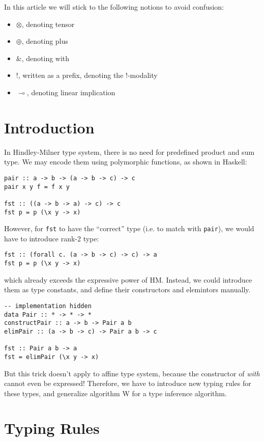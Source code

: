 \documentclass{article}
\begin{document}
\bigskip

In this article we will stick to the following notions to avoid confusion:
\begin{itemize}
  \item $\otimes$, denoting tensor
  \item $\oplus$, denoting plus
  \item $\&$, denoting with
  \item $!$, written as a prefix, denoting the !-modality
  \item $\multimap$, denoting linear implication
\end{itemize}

\section{Introduction}

In Hindley-Milner type system, there is no need for predefined product and sum type. We may encode them using polymorphic functions, as shown in Haskell:
\begin{lstlisting}
pair :: a -> b -> (a -> b -> c) -> c
pair x y f = f x y

fst :: ((a -> b -> a) -> c) -> c
fst p = p (\x y -> x)
\end{lstlisting}
However, for \lstinline{fst} to have the ``correct'' type (i.e. to match with \lstinline{pair}), we would have to introduce rank-2 type:
\begin{lstlisting}
fst :: (forall c. (a -> b -> c) -> c) -> a
fst p = p (\x y -> x)
\end{lstlisting}
which already exceeds the expressive power of HM. Instead, we could introduce them as type constants, and define their constructors and elemintors manually.
\begin{lstlisting}
-- implementation hidden
data Pair :: * -> * -> *
constructPair :: a -> b -> Pair a b
elimPair :: (a -> b -> c) -> Pair a b -> c

fst :: Pair a b -> a
fst = elimPair (\x y -> x)
\end{lstlisting}

But this trick doesn't apply to affine type system, because the constructor of \textit{with} cannot even be expressed! Therefore, we have to introduce new typing rules for these types, and generalize algorithm W for a type inference algorithm.

\section{Typing Rules}
\end{document}
